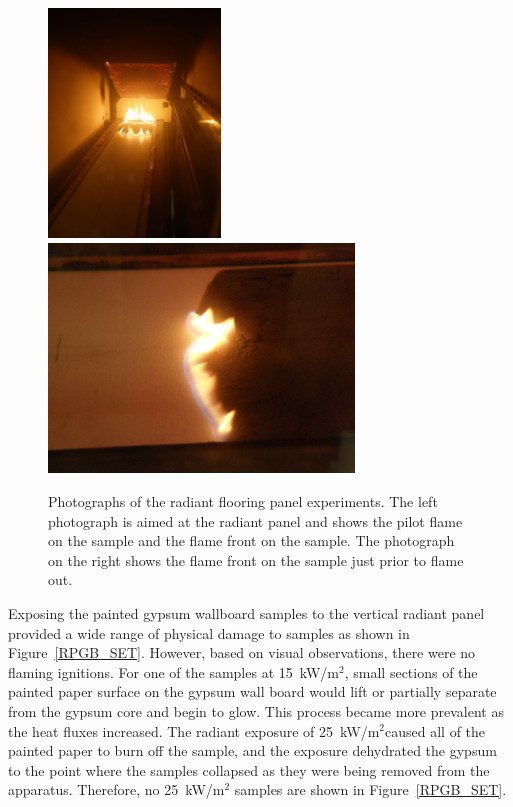 \documentclass[twoside]{uocthesis}
\begin{document}
{\begin{figure}
	\centering
	\includegraphics[width=1.8in]{../Figures/FRP_Test_Photo1}
	\includegraphics[width=3.2in]{../Figures/FRP_Test_Photo2} \\
	\caption[Photographs of the radiant flooring panel experiments.]{Photographs of the radiant flooring panel experiments.  The left photograph is aimed at the radiant panel and shows the pilot flame on the sample and the flame front on the sample.  The photograph on the right shows the flame front on the sample just prior to flame out.}
	\label{FRP_Test_Photos}
\end{figure}

Exposing the painted gypsum wallboard samples to the vertical radiant panel provided a wide range of physical damage to samples as shown in Figure~\ref{RPGB_SET}.  However, based on visual observations, there were no flaming ignitions.  For one of the samples at 15~kW/m$^2$, small sections of the painted paper surface on the gypsum wall board would lift or partially separate from the gypsum core and begin to glow.  This process became more prevalent as the heat fluxes increased.  The radiant exposure of 25~kW/m$^2$caused all of the painted paper to burn off the sample, and the exposure dehydrated the gypsum to the point where the samples collapsed as they were being removed from the apparatus.  Therefore, no 25~kW/m$^2$ samples are shown in Figure~\ref{RPGB_SET}.   

}
\end{document}
